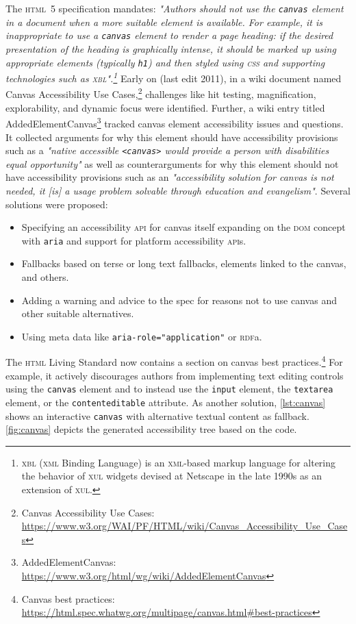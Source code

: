 \documentclass[sigconf]{acmart}
\begin{document}
The \textsc{html}\ 5 specification mandates: \textit{"Authors should not use the \texttt{canvas} element in a document when a more suitable element is available. For example, it is inappropriate to use a \texttt{canvas} element to render a page heading: if the desired presentation of the heading is graphically intense, it should be marked up using appropriate elements (typically \texttt{h1}) and then styled using \textsc{css} and supporting technologies such as \textsc{xbl}".\footnote{\textsc{xbl} (\textsc{xml} Binding Language) is an \textsc{xml}-based markup language for altering the behavior of \textsc{xul} widgets devised at Netscape in the late 1990s as an extension of \textsc{xul}.}} Early on (last edit 2011), in a wiki document named Canvas Accessibility Use Cases,\footnote{Canvas Accessibility Use Cases: \url{https://www.w3.org/WAI/PF/HTML/wiki/Canvas_Accessibility_Use_Cases}} challenges like hit testing, magnification, explorability, and dynamic focus were identified. Further, a wiki entry titled AddedElementCanvas\footnote{AddedElementCanvas: \url{https://www.w3.org/html/wg/wiki/AddedElementCanvas}} tracked canvas element accessibility issues and questions. It collected arguments for why this element should have accessibility provisions such as a \textit{"native accessible \texttt{<canvas>} would provide a person with disabilities equal opportunity"} as well as counterarguments for why this element should not have accessibility provisions such as an \textit{"accessibility solution for canvas is not needed, it [is] a usage problem solvable through education and evangelism"}. Several solutions were proposed:

\begin{itemize}
    \item Specifying an accessibility \textsc{api} for canvas itself expanding on the \textsc{dom} concept with \texttt{aria} and support for platform accessibility \textsc{api}s.
    \item Fallbacks based on terse or long text fallbacks, elements linked to the canvas, and others.
    \item Adding a warning and advice to the spec for reasons not to use canvas and other suitable alternatives.
    \item Using meta data like \texttt{aria-role="application"} or \textsc{rdf}a.
\end{itemize}

The \textsc{html} Living Standard now contains a section on canvas best practices.\footnote{Canvas best practices: \url{https://html.spec.whatwg.org/multipage/canvas.html#best-practices}} For example, it actively discourages authors from implementing text editing controls using the \texttt{canvas} element and to instead use the \texttt{input} element, the \texttt{textarea} element, or the \texttt{contenteditable} attribute. As another solution, \autoref{lst:canvas} shows an interactive \texttt{canvas} with alternative textual content as fallback. \autoref{fig:canvas} depicts the generated accessibility tree based on the code.
\end{document}
